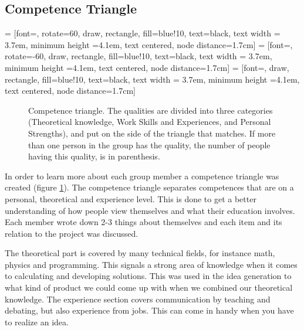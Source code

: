 
\subsection{Competence Triangle}

 = [font=\footnotesize, rotate=60,  draw, rectangle, fill=blue!10, text=black, text width = 3.7em, minimum height =4.1em, text centered, node distance=1.7cm]
 =  [font=\footnotesize, rotate=-60, draw, rectangle, fill=blue!10, text=black, text width = 3.7em, minimum height =4.1em, text centered, node distance=1.7cm]
 = [font=\footnotesize,             draw, rectangle, fill=blue!10, text=black, text width = 3.7em, minimum height =4.1em, text centered, node distance=1.7cm]

\begin{figure}[!ht]
\centering
{}
\caption[Competence triangle.]{Competence triangle. The qualities are divided into three categories (Theoretical knowledge, Work Skills and Experiences, and Personal Strengths), and put on the side of the triangle that matches. If more than one person in the group has the quality, the number of people having this quality, is in parenthesis.} \label{fig_triangle}
\end{figure}

In order to learn more about each group member a competence triangle was created (figure \ref{fig_triangle}). 
The competence triangle separates competences that are on a personal, theoretical and experience level. 
This is done to get a better understanding of how people view themselves and what their education involves.
Each member wrote down 2-3 things about themselves and each item and its relation to the project was discussed.

The theoretical part is covered by many technical fields, for instance math, physics and programming. 
This signals a strong area of knowledge when it comes to calculating and developing solutions. 
This was used in the idea generation to what kind of product we could come up with when we combined our theoretical knowledge. The experience section covers communication by teaching and debating, but also experience from jobs. This can come in handy when you have to realize an idea. 


